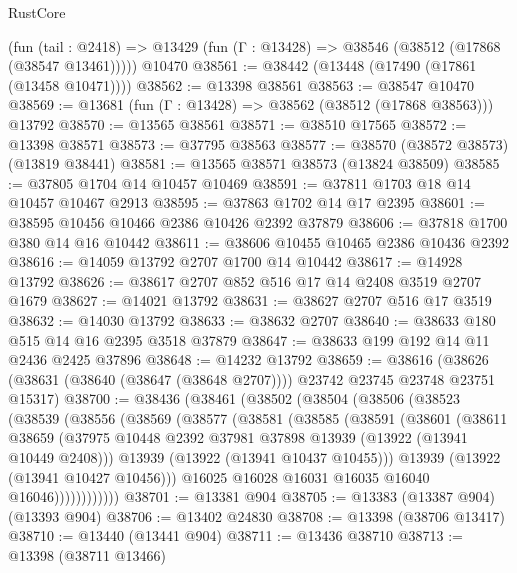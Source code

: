 \begin{lexlean}{RustCore}
\begin{coremodule}
    (fun (tail : @2418) => @13429 (fun (Γ : @13428) => @38546 (@38512 (@17868 (@38547 @13461)))))
    @10470
@38561 := @38442 (@13448 (@17490 (@17861 (@13458 @10471))))
@38562 := @13398 @38561
@38563 := @38547 @10470
@38569 := @13681 (fun (Γ : @13428) => @38562 (@38512 (@17868 @38563))) @13792
@38570 := @13565 @38561
@38571 := @38510 @17565
@38572 := @13398 @38571
@38573 := @37795 @38563
@38577 := @38570 (@38572 @38573) (@13819 @38441)
@38581 := @13565 @38571 @38573 (@13824 @38509)
@38585 := @37805 @1704 @14 @10457 @10469
@38591 := @37811 @1703 @18 @14 @10457 @10467 @2913
@38595 := @37863 @1702 @14 @17 @2395
@38601 := @38595 @10456 @10466 @2386 @10426 @2392 @37879
@38606 := @37818 @1700 @380 @14 @16 @10442
@38611 := @38606 @10455 @10465 @2386 @10436 @2392
@38616 := @14059 @13792 @2707 @1700 @14 @10442
@38617 := @14928 @13792
@38626 := @38617 @2707 @852 @516 @17 @14 @2408 @3519 @2707 @1679
@38627 := @14021 @13792
@38631 := @38627 @2707 @516 @17 @3519
@38632 := @14030 @13792
@38633 := @38632 @2707
@38640 := @38633 @180 @515 @14 @16 @2395 @3518 @37879
@38647 := @38633 @199 @192 @14 @11 @2436 @2425 @37896
@38648 := @14232 @13792
@38659 := @38616
    (@38626 (@38631 (@38640 (@38647 (@38648 @2707)))) @23742 @23745 @23748 @23751 @15317)
@38700 := @38436
    (@38461
      (@38502
        (@38504
          (@38506
            (@38523
              (@38539
                (@38556
                  (@38569
                    (@38577
                      (@38581
                        (@38585
                          (@38591
                            (@38601
                              (@38611
                                @38659
                                (@37975
                                  @10448
                                  @2392
                                  @37981
                                  @37898
                                  @13939
                                  (@13922 (@13941 @10449 @2408)))
                                @13939
                                (@13922 (@13941 @10437 @10455)))
                              @13939
                              (@13922 (@13941 @10427 @10456)))
                            @16025
                            @16028
                            @16031
                            @16035
                            @16040
                            @16046))))))))))))
@38701 := @13381 @904
@38705 := @13383 (@13387 @904) (@13393 @904)
@38706 := @13402 @24830
@38708 := @13398 (@38706 @13417)
@38710 := @13440 (@13441 @904)
@38711 := @13436 @38710
@38713 := @13398 (@38711 @13466)

\end{coremodule}
\end{lexlean}

